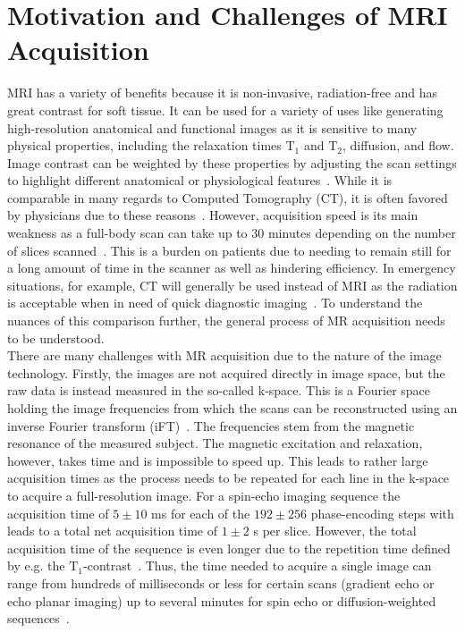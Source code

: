 \section{Motivation and Challenges of MRI Acquisition} \label{Sec:MotivationChallengesMRIAcquisition}
MRI has a variety of benefits because it is non-invasive, radiation-free and has great contrast for soft tissue. It can be used for a variety of uses like generating high-resolution anatomical and functional images as it is sensitive to many physical properties, including the relaxation times $\text{T}_1$ and $\text{T}_2$, diffusion, and flow. Image contrast can be weighted by these properties by adjusting the scan settings to highlight different anatomical or physiological features~\cite{AdvancesPI}. While it is comparable in many regards to Computed Tomography (CT), it is often favored by physicians due to these reasons~\cite{Liu2013}. However, acquisition speed is its main weakness as a full-body scan can take up to 30 minutes depending on the number of slices scanned~\cite{Brown2014,PulseSequences}. This is a burden on patients due to needing to remain still for a long amount of time in the scanner as well as hindering efficiency. In emergency situations, for example, CT will generally be used instead of MRI as the radiation is acceptable when in need of quick diagnostic imaging~\cite{Liu2013}. To understand the nuances of this comparison further, the general process of MR acquisition needs to be understood.\\
There are many challenges with MR acquisition due to the nature of the image technology. Firstly, the images are not acquired directly in image space, but the raw data is instead measured in the so-called k-space. This is a Fourier space holding the image frequencies from which the scans can be reconstructed using an inverse Fourier transform (iFT)~\cite{Brown2014}. The frequencies stem from the magnetic resonance of the measured subject. The magnetic excitation and relaxation, however, takes time and is impossible to speed up. This leads to rather large acquisition times as the process needs to be repeated for each line in the k-space to acquire a full-resolution image. For a spin-echo imaging sequence the acquisition time of $5 \pm 10$ ms for each of the $192 \pm 256$ phase-encoding steps with leads to a total net acquisition time of $1 \pm 2$ s per slice. However, the total acquisition time of the sequence is even longer due to the repetition time defined by e.g. the $\text{T}_1$-contrast~\cite{SamplingStrategies}. Thus, the time needed to
acquire a single image can range from hundreds of milliseconds or less for certain scans (gradient echo or echo planar imaging) up to several minutes for spin echo or diffusion-weighted sequences~\cite{AdvancesPI}.\\
